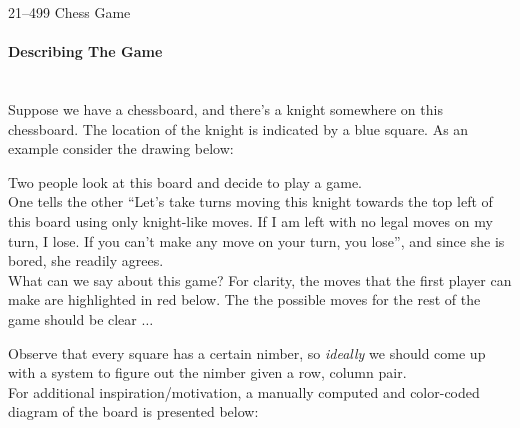 \documentclass{article}
\begin{document}
\begin{center}
  21--499 Chess Game
\end{center}
\paragraph{Describing The Game}\mbox{}\\
Suppose we have a chessboard, and there's a knight somewhere on this
chessboard. The location of the knight is indicated by a blue square.
As an example consider the drawing below: \\
\begin{center}
\end{center}
Two people look at this board and decide to play a game. \\
One tells the other ``Let's take turns moving this knight towards the top left
of this board using only knight-like moves. If I am left with no
legal moves on my turn, I lose. If you can't make any move on your
turn, you lose'', and since she is bored, she readily agrees. \\
What can we say about this game? For clarity, the moves that the first
player can make are highlighted in red below. The the possible moves
for the rest of the game should be clear $\ldots$
\begin{center}
\end{center}
Observe that every square has a certain nimber, so \textit{ideally} we
should come up with a system to figure out the nimber given a
row, column pair. \\
For additional inspiration/motivation, a manually computed and 
color-coded diagram of the board is presented below:
\end{document}
